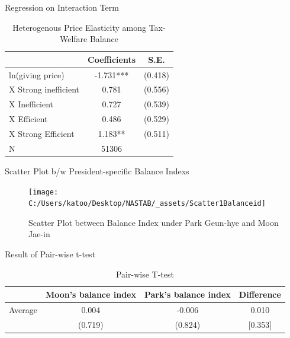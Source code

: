 \documentclass[
  ignorenonframetext,
]{beamer}
\begin{document}
\begin{frame}{Regression on Interaction Term}
\protect\hypertarget{regression-on-interaction-term-1}{}
\begin{table}

\caption{\label{tab:kableEstimateInteractionByBalanceGroup}Heterogenous Price Elasticity among Tax-Welfare Balance}
\centering
\begin{tabular}[t]{lcc}
\toprule
 & Coefficients & S.E.\\
\midrule
ln(giving price) & -1.731*** & (0.418)\\
\hspace{1em}X Strong inefficient & 0.781 & (0.556)\\
\hspace{1em}X Inefficient & 0.727 & (0.539)\\
\hspace{1em}X Efficient & 0.486 & (0.529)\\
\hspace{1em}X Strong Efficient & 1.183** & (0.511)\\
N & 51306 & \\
\bottomrule
\end{tabular}
\end{table}
\end{frame}

\begin{frame}{Scatter Plot b/w President-specific Balance Indexs}
\protect\hypertarget{scatter-plot-bw-president-specific-balance-indexs}{}
\begin{figure}
\texttt{[image: C:/Users/katoo/Desktop/NASTAB/\_assets/Scatter1Balanceid]} \caption{Scatter Plot between Balance Index under Park Geun-hye and Moon Jae-in}\label{fig:unnamed-chunk-11}
\end{figure}
\end{frame}

\begin{frame}{Result of Pair-wise t-test}
\protect\hypertarget{result-of-pair-wise-t-test-1}{}
\begin{table}

\caption{\label{tab:kableTtestPresidentBalanceid}Pair-wise T-test}
\centering
\fontsize{9}{11}\selectfont
\begin{tabular}[t]{lccc}
\toprule
 & Moon's balance index & Park's balance index & Difference\\
\midrule
Average & 0.004 & -0.006 & 0.010\\
 & (0.719) & (0.824) & [0.353]\\
\bottomrule
\end{tabular}
\end{table}
\end{frame}
\end{document}

